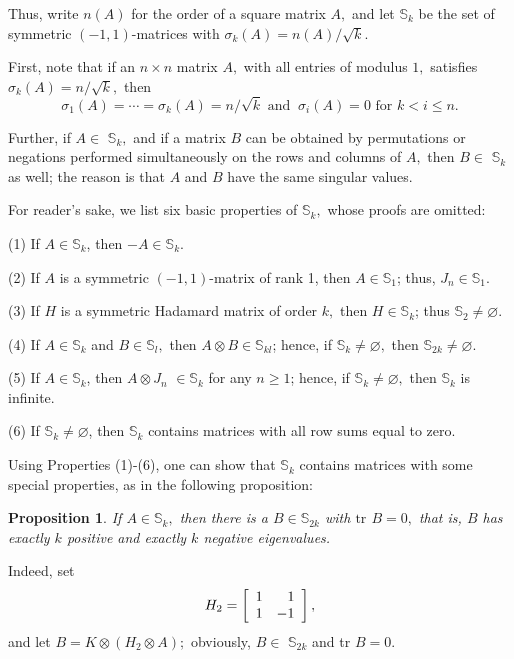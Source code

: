 \documentclass[12pt]{article}%
\newtheorem{proposition}[theorem]{Proposition}
\begin{document}
Thus, write $n\left(  A\right)  $ for the order of a square matrix $A,$ and
let $\mathbb{S}_{k}$ be the set of symmetric $\left(  -1,1\right)  $-matrices
with $\sigma_{k}\left(  A\right)  =n\left(  A\right)  /\sqrt{k}.$

First, note that if an $n\times n$ matrix $A,$ with all entries of modulus
$1,$ satisfies $\sigma_{k}\left(  A\right)  =n/\sqrt{k},$ then
\[
\sigma_{1}\left(  A\right)  =\cdots=\sigma_{k}\left(  A\right)  =n/\sqrt
{k}\text{\ \ and\ \ }\ \sigma_{i}\left(  A\right)  =0\text{ \ \ for \ }k<i\leq
n.
\]


Further, if $A\in$ $\mathbb{S}_{k},$ and if a matrix $B$ can be obtained by
permutations or negations performed simultaneously on the rows and columns of
$A,$ then $B\in$ $\mathbb{S}_{k}$ as well; the reason is that $A$ and $B$ have
the same singular values.\medskip

For reader's sake, we list six basic properties of $\mathbb{S}_{k},$ whose
proofs are omitted:\medskip

(1) If $A\in\mathbb{S}_{k}$, then $-A\in\mathbb{S}_{k}.$

(2) If $A$ is a symmetric $\left(  -1,1\right)  $-matrix of rank 1, then
$A\in\mathbb{S}_{1}$; thus, $J_{n}\in\mathbb{S}_{1}.$

(3) If $H$ is a symmetric Hadamard matrix of order $k,$ then $H\in
\mathbb{S}_{k}$; thus $\mathbb{S}_{2}\neq\varnothing.$

(4) If $A\in\mathbb{S}_{k}$ and $B\in\mathbb{S}_{l},$ then $A\otimes
B\in\mathbb{S}_{kl}$; hence, if $\mathbb{S}_{k}\neq\varnothing,$ then
$\mathbb{S}_{2k}\neq\varnothing.$

(5) If $A\in\mathbb{S}_{k}$, then $A\otimes J_{n}$ $\in\mathbb{S}_{k}$ for any
$n\geq1$; hence, if $\mathbb{S}_{k}\neq\varnothing,$ then $\mathbb{S}_{k}$ is infinite.

(6) If $\mathbb{S}_{k}\neq\varnothing$, then $\mathbb{S}_{k}$ contains
matrices with all row sums equal to zero.\medskip

Using Properties (1)-(6), one can show that $\mathbb{S}_{k}$ contains matrices
with some special properties, as in the following proposition:

\begin{proposition}
\label{props}If $A\in\mathbb{S}_{k},$ then there is a $B\in\mathbb{S}_{2k}$
with $\mathrm{tr}$\textrm{ }$B=0,$ that is, $B$ has exactly $k$ positive and
exactly $k$ negative eigenvalues.
\end{proposition}

Indeed, set
\[
H_{2}=\left[
\begin{array}
[c]{rr}%
1 & 1\\
1 & -1
\end{array}
\right]  ,
\]
and let $B=K\otimes\left(  H_{2}\otimes A\right)  ;$ obviously, $B\in$
$\mathbb{S}_{2k}$ and \textrm{tr }$B=0$.\bigskip
\end{document}
